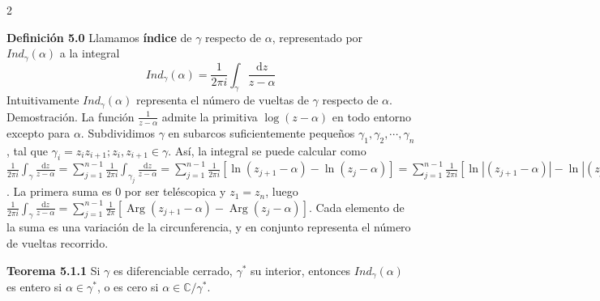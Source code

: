 \documentclass[a4paper, 11pt]{extarticle}
\newcommand{\tma}[1]{\textcolor{rojo}{\textbf{Teorema #1}}}
\newcommand{\defi}[1]{\textcolor{azul}{\textbf{Definición #1}}}
\newcommand{\dem}[1]{\textcolor{gris}{\small{Demostración. #1}}}
\begin{document}
\begin{multicols*}{2}


\defi{5.0} Llamamos \textbf{índice} de \(\gamma\) respecto de \(\alpha\),
representado por \(Ind_{\gamma}(\alpha)\) a la integral 
\[ Ind_{\gamma}(\alpha) = \frac{1}{2\pi i}\int _\gamma \frac{\text{d}
z}{z-\alpha}   \]
Intuitivamente \(Ind_\gamma(\alpha)\) representa el número de vueltas de \(\gamma\) respecto de \(\alpha\).
\dem{ La función \( \frac{1}{z-\alpha} \) admite la primitiva \( \log{(z - \alpha)} \) en todo entorno excepto 
para \( \alpha \). Subdividimos \( \gamma \) en subarcos suficientemente pequeños \( \gamma_1, \gamma_2, \cdots, \gamma_n \), tal que
\( \gamma_i = z_iz_{i+1}; z_i,z_{i+1} \in \gamma \). Así, la integral se puede calcular como 
\( \frac{1}{2\pi i} \int _\gamma  \frac{\text{d} z}{z - \alpha} =
 \sum _{j=1}^{n-1} \frac{1}{2\pi i} \int _{\gamma_j}  \frac{\text{d} z}{z - \alpha} 
= \sum_{j=1}^{n-1} \frac{1}{2 \pi i}[\ln (z_{j+1}-\alpha)-\ln (z_{j}-\alpha)] = 
 \sum_{j=1}^{n-1} \frac{1}{2 \pi i}[\ln |(z_{j+1}-\alpha)|-\ln |(z_{j}-\alpha)|]+\sum_{j=1}^{n-1} 
\frac{1}{2 \pi}[\operatorname{Arg}(z_{j+1}-\alpha)-\operatorname{Arg}(z_{j}-\alpha)]
 \). La primera suma es 0 por ser teléscopica y \( z_1 = z_n \), luego 
\( \frac{1}{2\pi i} \int _\gamma  \frac{\text{d} z}{z - \alpha} = \sum_{j=1}^{n-1} 
\frac{1}{2 \pi}[\operatorname{Arg}(z_{j+1}-\alpha)-\operatorname{Arg}(z_{j}-\alpha)] \). Cada elemento de la suma
es una variación de la circunferencia, y en conjunto representa el número de vueltas
recorrido.}

\tma{5.1.1} Si \(\gamma\) es diferenciable cerrado, \(\gamma^*\) su
interior, entonces \(Ind_\gamma(\alpha)\) es
entero si \(\alpha \in \gamma^*\), o es cero si \(\alpha \in
\mathbb{C}/\gamma^*\). 


\end{multicols*}
\end{document}
